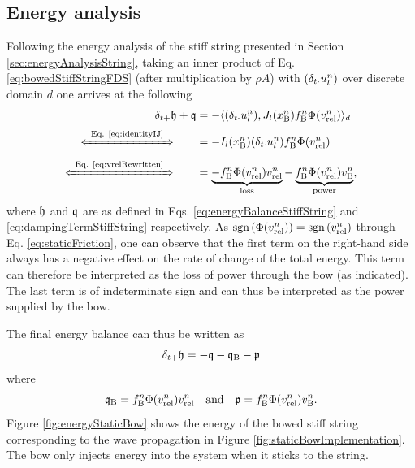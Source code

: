 \subsection{Energy analysis}
Following the energy analysis of the stiff string presented in Section \ref{sec:energyAnalysisString}, taking an inner product of Eq. \eqref{eq:bowedStiffStringFDS} (after multiplication by $\rho A$) with $(\delta_{t\cdot} u_l^n)$ over discrete domain $d$ one arrives at the following 
\begin{align*}
    \dtp \h + \q &=  - \langle (\dtd \uln), J_l(x_\Btxt^n)f_\Btxt^n\Phi(\vrel^n) \rangle_d\\[-5pt]
    \xLeftrightarrow{\mystrut\ \text{Eq. \eqref{eq:identityIJ}}\ }\qquad &= -I_l(x_\Btxt^n)(\dtd \uln) f_\Btxt^n \Phi(\vrel^n) \\[-5pt]
    \xLeftrightarrow{\mystrut\ \text{Eq. \eqref{eq:vrelRewritten}}\ } \qquad &= \underbrace{-f_\Btxt^n \Phi(\vrel^n) \vrel^n}_{\text{loss}} - \underbrace{f_\Btxt^n \Phi(\vrel^n)v_\Btxt^n}_{\text{power}},
\end{align*}
where $\mathfrak{h}$ and $\mathfrak{q}$ are as defined in Eqs. \eqref{eq:energyBalanceStiffString} and \eqref{eq:dampingTermStiffString} respectively. As $\text{sgn}\left(\Phi(v_\text{rel}^n)\right) = \text{sgn}\left(v_\text{rel}^n\right)$ through Eq. \eqref{eq:staticFriction}, one can observe that the first term on the right-hand side always has a negative effect on the rate of change of the total energy. This term can therefore be interpreted as the loss of power through the bow (as indicated). The last term is of indeterminate sign and can thus be interpreted as the power supplied by the bow. 

The final energy balance can thus be written as
\begin{equation}\label{eq:energyBalanceBow}
    \delta_{t+} \mathfrak{h} = -\mathfrak{q} - \mathfrak{q}_\text{B} - \mathfrak{p} 
\end{equation}
where 
\begin{equation*}
    \mathfrak{q}_\text{B} = f_{\text{B}}^n \Phi(v_\text{rel}^n) v_\text{rel}^n \quad \text{and} \quad \mathfrak{p} = f_{\text{B}}^n \Phi(v_\text{rel}^n)v_{\text{B}}^n.
\end{equation*}
Figure \ref{fig:energyStaticBow} shows the energy of the bowed stiff string corresponding to the wave propagation in Figure \ref{fig:staticBowImplementation}. The bow only injects energy into the system when it sticks to the string. 

